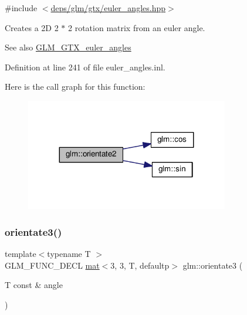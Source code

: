 {\ttfamily \#include $<$\hyperlink{euler__angles_8hpp}{deps/glm/gtx/euler\+\_\+angles.\+hpp}$>$}

Creates a 2D 2 $\ast$ 2 rotation matrix from an euler angle. \begin{DoxySeeAlso}{See also}
\hyperlink{group__gtx__euler__angles}{G\+L\+M\+\_\+\+G\+T\+X\+\_\+euler\+\_\+angles} 
\end{DoxySeeAlso}


Definition at line 241 of file euler\+\_\+angles.\+inl.

Here is the call graph for this function\+:
\nopagebreak
\begin{figure}[H]
\begin{center}
\leavevmode
\includegraphics[width=251pt]{d2/d7e/group__gtx__euler__angles_gae16738a9f1887cf4e4db6a124637608d_cgraph}
\end{center}
\end{figure}
\mbox{\label{group__gtx__euler__angles_ga7ca98668a5786f19c7b38299ebbc9b4c}} 
\subsubsection{\texorpdfstring{orientate3()}{orientate3()}\hspace{0.1cm}{\footnotesize\ttfamily [1/2]}}
{\footnotesize\ttfamily template$<$typename T $>$ \\
G\+L\+M\+\_\+\+F\+U\+N\+C\+\_\+\+D\+E\+CL \hyperlink{structglm_1_1mat}{mat}$<$3, 3, T, defaultp$>$ glm\+::orientate3 (\begin{DoxyParamCaption}\item[{T const \&}]{angle }\end{DoxyParamCaption})}



